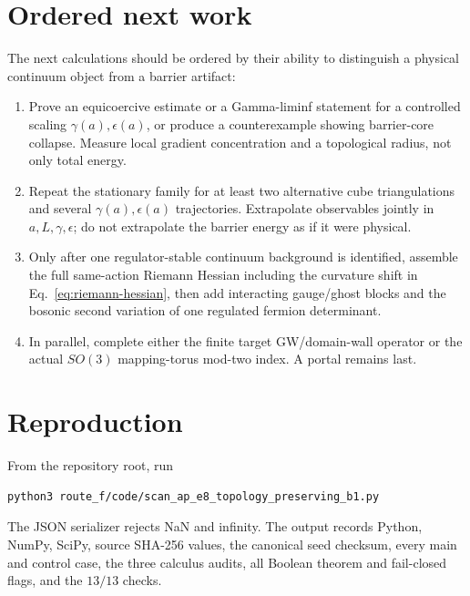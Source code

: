 \documentclass[11pt]{article}
\numberwithin{equation}{section}
\theoremstyle{definition}
\theoremstyle{remark}
\begin{document}
\section{Ordered next work}

The next calculations should be ordered by their ability to distinguish a
physical continuum object from a barrier artifact:
\begin{enumerate}
\item Prove an equicoercive estimate or a Gamma-liminf statement for a
controlled scaling \(\gamma(a),\epsilon(a)\), or produce a counterexample
showing barrier-core collapse.  Measure local gradient concentration and a
topological radius, not only total energy.
\item Repeat the stationary family for at least two alternative cube
triangulations and several \(\gamma(a),\epsilon(a)\) trajectories.  Extrapolate
observables jointly in \(a,L,\gamma,\epsilon\); do not extrapolate the barrier
energy as if it were physical.
\item Only after one regulator-stable continuum background is identified,
assemble the full same-action Riemann Hessian including the curvature shift
in Eq.~\eqref{eq:riemann-hessian}, then add interacting gauge/ghost blocks and
the bosonic second variation of one regulated fermion determinant.
\item In parallel, complete either the finite target GW/domain-wall operator
or the actual \(SO(3)\) mapping-torus mod-two index.  A portal remains last.
\end{enumerate}

\section{Reproduction}

From the repository root, run
\begin{verbatim}
python3 route_f/code/scan_ap_e8_topology_preserving_b1.py
\end{verbatim}
The JSON serializer rejects NaN and infinity.  The output records Python,
NumPy, SciPy, source SHA-256 values, the canonical seed checksum, every main
and control case, the three calculus audits, all Boolean theorem and fail-closed
flags, and the \(13/13\) checks.



\end{document}

